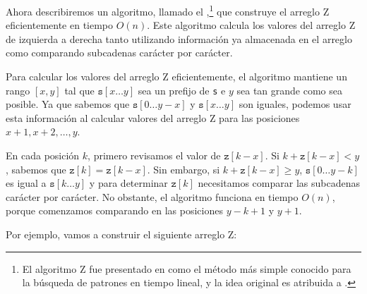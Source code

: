 Ahora describiremos un algoritmo, llamado el ,\footnote{
    El algoritmo Z fue presentado en \cite{gus97} como el método más
    simple conocido para la búsqueda de patrones en tiempo lineal, y la
    idea original es atribuida a \cite{mai84}.
} que construye el arreglo Z eficientemente en tiempo $O(n)$. Este
algoritmo calcula los valores del arreglo Z de izquierda a derecha
tanto utilizando información ya almacenada en el arreglo como
comparando subcadenas carácter por carácter.

Para calcular los valores del arreglo Z eficientemente, el algoritmo
mantiene un rango $[x,y]$ tal que $\texttt{s}[x \ldots y]$ sea un
prefijo de \texttt{s} e $y$ sea tan grande como sea posible. Ya que
sabemos que $\texttt{s}[0 \ldots y-x]$ y $\texttt{s}[x \ldots y]$ son
iguales, podemos usar esta información al calcular valores del arreglo
Z para las posiciones $x+1,x+2,\ldots,y$.

En cada posición $k$, primero revisamos el valor de $\texttt{z}[k-x]$.
Si $k+\texttt{z}[k-x]<y$, sabemos que $\texttt{z}[k]=\texttt{z}[k-x]$.
Sin embargo, si $k+\texttt{z}[k-x] \ge y$, $\texttt{s}[0 \ldots y-k]$
es igual a $\texttt{s}[k \ldots y]$ y para determinar $\texttt{z}[k]$
necesitamos comparar las subcadenas carácter por carácter. No obstante,
el algoritmo funciona en tiempo $O(n)$, porque comenzamos comparando en
las posiciones $y-k+1$ y $y+1$.

Por ejemplo, vamos a construir el siguiente arreglo Z:

